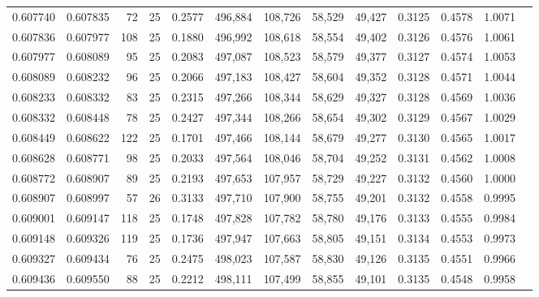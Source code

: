 \begin{tabular}{rrrrrrrrrrrrr}
0.607740 & 0.607835 &    72 &  25 &                                     0.2577 & 496,884 & 108,726 &  58,529 &  49,427 & 0.3125 & 0.4578 & 1.0071 \\
0.607836 & 0.607977 &   108 &  25 &                                     0.1880 & 496,992 & 108,618 &  58,554 &  49,402 & 0.3126 & 0.4576 & 1.0061 \\
0.607977 & 0.608089 &    95 &  25 &                                     0.2083 & 497,087 & 108,523 &  58,579 &  49,377 & 0.3127 & 0.4574 & 1.0053 \\
0.608089 & 0.608232 &    96 &  25 &                                     0.2066 & 497,183 & 108,427 &  58,604 &  49,352 & 0.3128 & 0.4571 & 1.0044 \\
0.608233 & 0.608332 &    83 &  25 &                                     0.2315 & 497,266 & 108,344 &  58,629 &  49,327 & 0.3128 & 0.4569 & 1.0036 \\
0.608332 & 0.608448 &    78 &  25 &                                     0.2427 & 497,344 & 108,266 &  58,654 &  49,302 & 0.3129 & 0.4567 & 1.0029 \\
0.608449 & 0.608622 &   122 &  25 &                                     0.1701 & 497,466 & 108,144 &  58,679 &  49,277 & 0.3130 & 0.4565 & 1.0017 \\
0.608628 & 0.608771 &    98 &  25 &                                     0.2033 & 497,564 & 108,046 &  58,704 &  49,252 & 0.3131 & 0.4562 & 1.0008 \\
0.608772 & 0.608907 &    89 &  25 &                                     0.2193 & 497,653 & 107,957 &  58,729 &  49,227 & 0.3132 & 0.4560 & 1.0000 \\
0.608907 & 0.608997 &    57 &  26 &                                     0.3133 & 497,710 & 107,900 &  58,755 &  49,201 & 0.3132 & 0.4558 & 0.9995 \\
0.609001 & 0.609147 &   118 &  25 &                                     0.1748 & 497,828 & 107,782 &  58,780 &  49,176 & 0.3133 & 0.4555 & 0.9984 \\
0.609148 & 0.609326 &   119 &  25 &                                     0.1736 & 497,947 & 107,663 &  58,805 &  49,151 & 0.3134 & 0.4553 & 0.9973 \\
0.609327 & 0.609434 &    76 &  25 &                                     0.2475 & 498,023 & 107,587 &  58,830 &  49,126 & 0.3135 & 0.4551 & 0.9966 \\
0.609436 & 0.609550 &    88 &  25 &                                     0.2212 & 498,111 & 107,499 &  58,855 &  49,101 & 0.3135 & 0.4548 & 0.9958 \\

\end{tabular}
